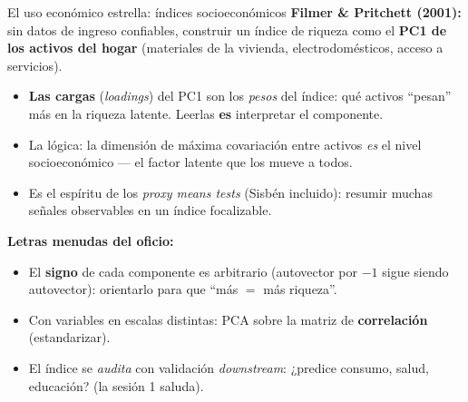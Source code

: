 \documentclass{beamer}
\newcommand{\1}{\mathbb{I}}
\begin{document}
\begin{frame}{El uso económico estrella: índices socioeconómicos}
\small
\textbf{Filmer \& Pritchett (2001):} sin datos de ingreso confiables, construir un índice de riqueza como el \textbf{PC1 de los activos del hogar} (materiales de la vivienda, electrodomésticos, acceso a servicios).
\pause

\begin{itemize}\itemsep5pt
  \item \textbf{Las cargas} (\emph{loadings}) del PC1 son los \emph{pesos} del índice: qué activos ``pesan'' más en la riqueza latente. Leerlas \textbf{es} interpretar el componente.
  \item La lógica: la dimensión de máxima covariación entre activos \emph{es} el nivel socioeconómico --- el factor latente que los mueve a todos. \pause
  \item Es el espíritu de los \emph{proxy means tests} (Sisbén incluido): resumir muchas señales observables en un índice focalizable.
\end{itemize}
\pause

\vspace{0.1cm}
\textbf{Letras menudas del oficio:}
\begin{itemize}\itemsep3pt
  \item El \textbf{signo} de cada componente es arbitrario (autovector por $-1$ sigue siendo autovector): orientarlo para que ``más $=$ más riqueza''.
  \item Con variables en escalas distintas: PCA sobre la matriz de \textbf{correlación} (estandarizar).
  \item El índice se \emph{audita} con validación \emph{downstream}: ¿predice consumo, salud, educación? (la sesión 1 saluda).
\end{itemize}
\end{frame}
\end{document}
